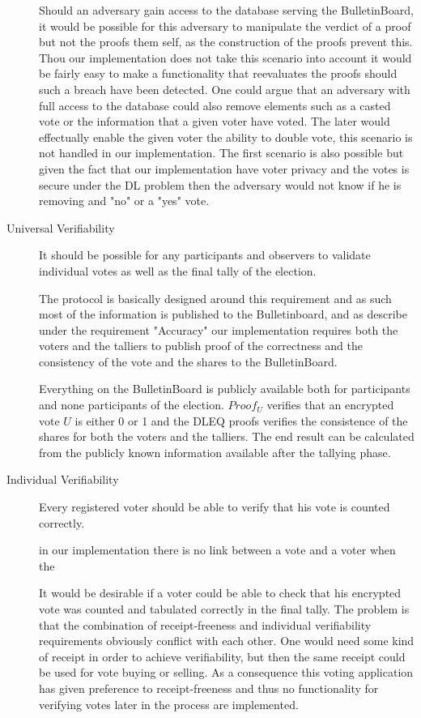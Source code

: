 \begin{description}
        \noindent
        Should an adversary gain access to the database serving the BulletinBoard, it would be possible for this adversary to manipulate the verdict of a proof but not
        the proofs them self, as the construction of the proofs prevent this. Thou our implementation does not take this scenario into account it would be fairly easy to make
        a functionality that reevaluates the proofs should such a breach have been detected. One could argue that an adversary with full access to the database could also remove elements such as a casted vote or the information that a given voter have voted. The later would effectually enable the given voter the ability to double vote, this scenario is not handled in our implementation. The first scenario is also possible but given the fact that our implementation have voter privacy and the votes is secure under the DL problem then the adversary would not know if he is removing and "no" or a "yes" vote. 
        
        
    \item[Universal Verifiability]
        It should be possible for any participants and observers to validate individual votes as well as the final tally of the election. 
        
        \noindent
        The protocol is basically designed around this requirement and as such most of the information is published to the Bulletinboard, and as describe under the requirement "Accuracy" our implementation requires both the voters and the talliers to publish proof of the correctness and the consistency of the vote and the shares to the BulletinBoard. 
        
        \noindent
        Everything on the BulletinBoard is publicly available both for participants and none participants of the election. $Proof_U$ verifies that an encrypted vote $U$ is either 0 or 1 and the DLEQ proofs verifies the consistence of the shares for both the voters and the talliers. The end result can be calculated from the publicly known information available after the tallying phase. 
            
    \item[Individual Verifiability]
        Every registered voter should be able to verify that his vote is counted correctly. 
        
        \noindent
        in our implementation there is no link between a vote and a voter when the  
        
        It would be desirable if a voter could be able to check that his encrypted vote
was counted and tabulated correctly in the final tally. The problem is that
the combination of receipt-freeness and individual verifiability requirements
obviously conflict with each other. One would need some kind of receipt in
order to achieve verifiability, but then the same receipt could be used for
vote buying or selling. As a consequence this voting application has given
preference to receipt-freeness and thus no functionality for verifying votes
later in the process are implemented.
        

\end{description}


